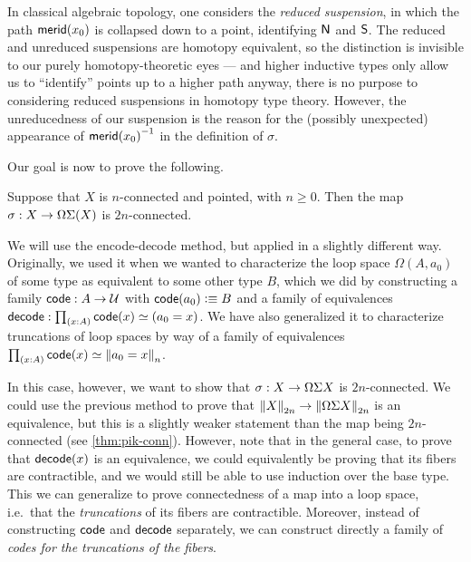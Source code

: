 \begin{rmk}
  In classical algebraic topology, one considers the \emph{reduced suspension}, in which the path $\merid(x_0)$ is collapsed down to a point, identifying $\north$ and $\south$.
  The reduced and unreduced suspensions are homotopy equivalent, so the distinction is invisible to our purely homotopy-theoretic eyes --- and higher inductive types only allow us to ``identify'' points up to a higher path anyway, there is no purpose to considering reduced suspensions in homotopy type theory.
  However, the unreducedness of our suspension is the reason for the (possibly unexpected) appearance of $\opp{\merid(x_0)}$ in the definition of $\sigma$.
\end{rmk}

Our goal is now to prove the following.

\begin{thm}\label{thm:freudenthal}
  Suppose that $X$ is $n$-connected and pointed, with $n\geq 0$.
  Then the map $\sigma:X\to \Omega\susp(X)$ is $2n$-connected.
\end{thm}

%

We will use the encode-decode method, but applied in a slightly different way.
Originally, we used it when we wanted to characterize the loop space $\Omega (A,a_0)$ of some type as equivalent to some other type $B$, which we did by constructing a family $\code:A\to \type$ with $\code(a_0)\defeq B$ and a family of equivalences $\decode:\prd{x:A}\code(x) \eqvsym (a_0=x)$.
We have also generalized it to characterize truncations of loop spaces by way of a family of equivalences $\prd{x:A}\code(x) \eqvsym \trunc n{a_0=x}$.

In this case, however, we want to show that $\sigma:X\to \Omega \susp X$ is $2n$-connected.
We could use the previous method to prove that $\trunc{2n}X\to \trunc{2n}{\Omega \susp X}$ is an equivalence, but this is a slightly weaker statement than the map being $2n$-connected (see \autoref{thm:pik-conn}).
However, note that in the general case, to prove that $\decode(x)$ is an equivalence, we could equivalently be proving that its fibers are contractible, and we would still be able to use induction over the base type.
This we can generalize to prove connectedness of a map into a loop space, i.e.\ that the \emph{truncations} of its fibers are contractible.
Moreover, instead of constructing $\code$ and $\decode$ separately, we can construct directly a family of \emph{codes for the truncations of the fibers}.

